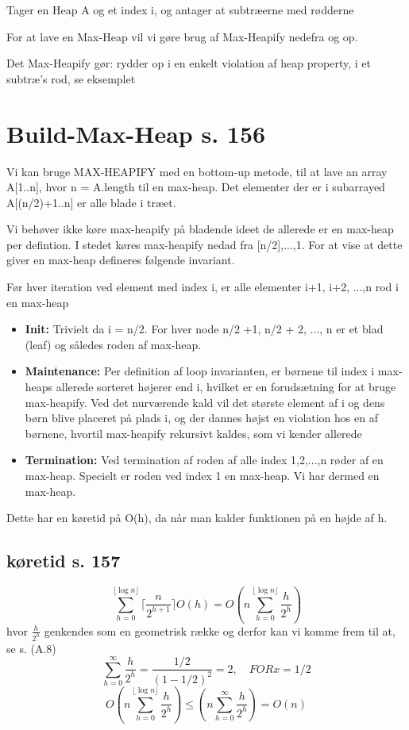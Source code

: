 \documentclass[11pt,a4paper]{report}
\theoremstyle{plain}
\theoremstyle{definition}
\theoremstyle{remark}
\numberwithin{equation}{section}
\begin{document}
Tager en Heap A og et index i, og antager at subtræerne med rødderne

For at lave en Max-Heap vil vi gøre brug af Max-Heapify nedefra og op.

Det Max-Heapify gør: rydder op i en enkelt violation af heap property, i et subtræ's rod, se eksemplet

\section{Build-Max-Heap s. 156}
Vi kan bruge MAX-HEAPIFY med en bottom-up metode, til at lave an array A[1..n], hvor n = A.length til en max-heap. Det elementer der er i subarrayed A[(n/2)+1..n] er alle blade i træet.

Vi behøver ikke køre max-heapify på bladende ideet de allerede er en max-heap per defintion. I stedet køres max-heapify nedad fra [n/2],...,1.
For at vise at dette giver en max-heap defineres følgende invariant.

Før hver iteration ved element med index i, er alle elementer i+1, i+2, ...,n rod i en max-heap

\begin{itemize}
  \item \textbf{Init:} Trivielt da i = n/2. For hver node n/2 +1, n/2 + 2, ..., n er et blad (leaf) og således roden af max-heap.
  \item \textbf{Maintenance:} Per definition af loop invarianten, er børnene til index i max-heaps allerede sorteret højerer end i, hvilket er en forudsætning for at bruge max-heapify. Ved det nurværende kald vil det største element af i og dens børn blive placeret på plads i, og der dannes højst en violation hos en af børnene, hvortil max-heapify rekursivt kaldes, som vi kender allerede
  \item \textbf{Termination:} Ved termination af roden af alle index 1,2,...,n røder af en max-heap. Specielt er roden ved index 1 en max-heap. Vi har dermed en max-heap.
\end{itemize}

Dette har en køretid på O(h), da når man kalder funktionen på en højde af h.

\subsection{køretid s. 157}
\[
\sum_{h=0}^{\lfloor \log n \rfloor} \lceil \frac{n}{2^{h+1}} \rceil O(h) = O \left(n \sum_{h=0}^{\lfloor \log n \rfloor} \frac{h}{2^h}\right)
\]
hvor $\frac{h}{2^h}$ genkendes som en geometrisk række og derfor kan vi komme frem til at, se s. (A.8)
\[
\sum_{h=0}^{\infty} \frac{h}{2^h} = \frac{1/2}{(1-1/2)^2} = 2 , \quad FOR x = 1/2
\]
\[
O\left(n \sum_{h=0}^{\lfloor \log n \rfloor} \frac{h}{2^h}\right) \leq \left(n \sum_{h=0}^{\infty} \frac{h}{2^h}\right) = O(n)
\]
\end{document}
